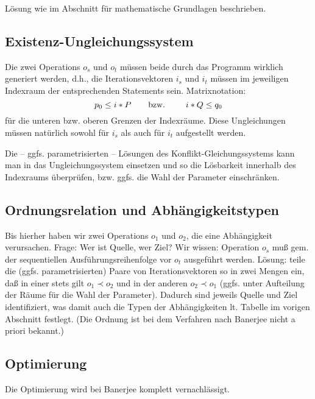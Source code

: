 Lösung wie im Abschnitt für mathematische Grundlagen
beschrieben. 

\subsection{Existenz-Ungleichungssystem}

Die zwei Operations $o_s$ und $o_t$ müssen beide durch das Programm
wirklich generiert werden, d.h., die Iterationsvektoren $i_s$ und $i_t$
müssen im jeweiligen Indexraum der entsprechenden Statements
sein. Matrixnotation: $$p_0 \leq i * P \hbox{\qquad bzw. \qquad} i*Q \leq
q_0$$ für die unteren bzw. oberen Grenzen der Indexräume. Diese
Ungleichungen müssen natürlich sowohl für $i_s$ als auch für $i_t$
aufgestellt werden.

Die -- ggfs. parametrisierten -- Lösungen des Konflikt-Gleichungssystems
kann man in das Ungleichungssystem einsetzen und so die Lösbarkeit
innerhalb des Indexraums überprüfen, bzw. ggfs. die Wahl der Parameter
einschränken.

\subsection{Ordnungsrelation und Abhängigkeitstypen}

Bis hierher haben wir zwei Operations $o_1$ und $o_2$, die eine
Abhängigkeit verursachen. Frage: Wer ist Quelle, wer Ziel?  Wir wissen:
Operation $o_s$ muß gem.  der sequentiellen Ausführungsreihenfolge vor
$o_t$ ausgeführt werden. Lösung: teile die (ggfs. parametrisierten)
Paare von Iterationsvektoren so in zwei Mengen ein, daß in einer stets
gilt $o_1 \prec o_2$ und in der anderen $o_2 \prec o_1$ (ggfs. unter
Aufteilung der Räume für die Wahl der Parameter). Dadurch sind jeweils
Quelle und Ziel identifiziert, was damit auch die Typen der
Abhängigkeiten lt. Tabelle im vorigen Abschnitt festlegt. (Die Ordnung ist bei dem Verfahren nach Banerjee nicht a priori bekannt.)

\subsection{Optimierung}
Die Optimierung wird bei Banerjee komplett vernachlässigt.

